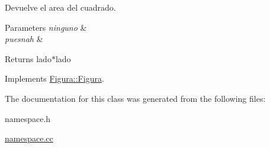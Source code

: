 Devuelve el area del cuadrado. 


\begin{DoxyParams}{Parameters}
{\em ninguno} & \\
\hline
{\em puesnah} & \\
\hline
\end{DoxyParams}
\begin{DoxyReturn}{Returns}
lado$\ast$lado 
\end{DoxyReturn}


Implements \hyperlink{classFigura_1_1Figura}{Figura\-::\-Figura}.



The documentation for this class was generated from the following files\-:\begin{DoxyCompactItemize}
\item 
namespace.\-h\item 
\hyperlink{namespace_8cc}{namespace.\-cc}\end{DoxyCompactItemize}
